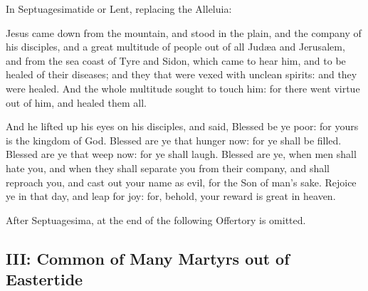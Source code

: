 
\begin{rubric}
{In Septuagesimatide or Lent, replacing the Alleluia:}
\end{rubric}

\vspace{-1ex}


\label{CommonMartyrsIIGospel}
 Jesus came down from the mountain, and stood in the plain, and the company of his disciples, and a great multitude of people out of all Jud{\ae}a and Jerusalem, and from the sea coast of Tyre and Sidon, which came to hear him, and to be healed of their diseases; and they that were vexed with unclean spirits: and they were healed. And the whole multitude sought to touch him: for there went virtue out of him, and healed them all.

And he lifted up his eyes on his disciples, and said, Blessed be ye poor: for yours is the kingdom of God. Blessed are ye that hunger now: for ye shall be filled. Blessed are ye that weep now: for ye shall laugh. Blessed are ye, when men shall hate you, and when they shall separate you from their company, and shall reproach you, and cast out your name as evil, for the Son of man’s sake. Rejoice ye in that day, and leap for joy: for, behold, your reward is great in heaven.

\begin{rubric}
	After Septuagesima,  at the end of the following Offertory is omitted.
\end{rubric}




\subsection{III: Common of Many Martyrs out of Eastertide}\label{CommonMartyrsIII}

